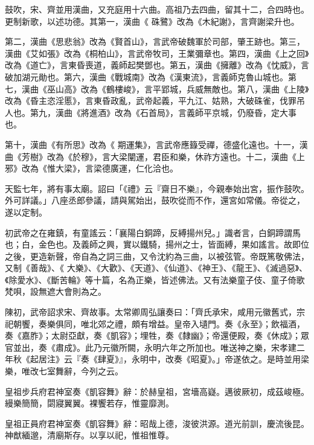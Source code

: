 \begin{pinyinscope}
 鼓吹，宋、齊並用漢曲，又充庭用十六曲。高祖乃去四曲，留其十二，合四時也。更制新歌，以述功德。其第一，漢曲《
 硃鷺》改為《木紀謝》，言齊謝梁升也。



 第二，漢曲《思悲翁》改為《賢首山》，言武帝破魏軍於司部，肇王跡也。第三，漢曲《艾如張》改為《桐柏山》，言武帝牧司，王業彌章也。第四，漢曲《上之回》改為《道亡》，言東昏喪道，義師起樊鄧也。第五，漢曲《擁離》改為《忱威》，言破加湖元勛也。第六，漢曲《戰城南》改為《漢東流》，言義師克魯山城也。第七，漢曲《巫山高》改為《鶴樓峻》，言平郢城，兵威無敵也。第八，漢曲《上陵》改為《昏主恣淫慝》，言東昏政亂，武帝起義，平九江、姑熟，大破硃雀，伐罪吊人也。第九，漢曲《將進酒》改為《石首局》，言義師平京城，仍廢昏，定大事也。



 第十，漢曲《有所思》改為《
 期運集》，言武帝應籙受禪，德盛化遠也。十一，漢曲《芳樹》改為《於穆》，言大梁闡運，君臣和樂，休祚方遠也。十二，漢曲《上邪》改為《惟大梁》，言梁德廣運，仁化洽也。



 天監七年，將有事太廟。詔曰「《禮》云『齋日不樂』，今親奉始出宮，振作鼓吹。外可詳議。」八座丞郎參議，請與駕始出，鼓吹從而不作，還宮如常儀。帝從之，遂以定制。



 初武帝之在雍鎮，有童謠云：「襄陽白銅蹄，反縛揚州兒。」識者言，白銅蹄謂馬也；白，金色也。及義師之興，實以鐵騎，揚州之士，皆面縛，果如謠言。故即位之後，更造新聲，帝自為之詞三曲，又令沈約為三曲，以被弦管。帝既篤敬佛法，又制《善哉》、《
 大樂》、《大歡》、《天道》、《仙道》、《神王》、《龍王》、《滅過惡》、《除愛水》、《斷苦輪》等十篇，名為正樂，皆述佛法。又有法樂童子伎、童子倚歌梵唄，設無遮大會則為之。



 陳初，武帝詔求宋、齊故事。太常卿周弘讓奏曰：「齊氏承宋，咸用元徽舊式，宗祀朝饗，奏樂俱同，唯北郊之禮，頗有增益。皇帝入壝門。奏《永至》；飲福酒，奏《嘉胙》；太尉亞獻，奏《凱容》；埋牲，奏《隸幽》；帝還便殿，奏《休成》；眾官並出，奏《肅成》。此乃元徽所闕，永明六年之所加也。唯送神之樂，宋孝建二年秋《起居注》云『奏《肆夏》』，永明中，改奏《昭夏》。」帝遂依之。是時並用梁樂，唯改七室舞辭，今列之云。



 皇祖步兵府君神室奏《凱容舞》辭：於赫皇祖，宮墻高嶷。邁彼厥初，成茲峻極。縵樂簡簡，閟寢翼翼。裸饗若存，惟靈靡測。



 皇祖正員府君神室奏《凱容舞》辭：昭哉上德，浚彼洪源。道光前訓，慶流後昆。神猷緬邈，清廟斯存。以享以祀，惟祖惟尊。




\end{pinyinscope}
